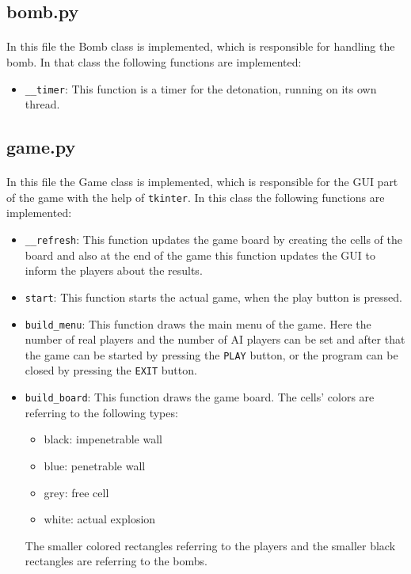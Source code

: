 \documentclass{article}
\begin{document}
    \subsection{bomb.py}
        \paragraph{}
        In this file the Bomb class is implemented, which is responsible for handling the bomb. In that class the following functions are implemented:
        \begin{itemize}
            \item \verb|__timer|: This function is a timer for the detonation, running on its own thread.
        \end{itemize}

    \subsection{game.py}
        \paragraph{}
        In this file the Game class is implemented, which is responsible for the GUI part of the game with the help of \verb|tkinter|. In this class the following functions are implemented:
        \begin{itemize}
            \item \verb|__refresh|: This function updates the game board by creating the cells of the board and also at the end of the game this function updates the GUI to inform the players about the results.
            \item \verb|start|: This function starts the actual game, when the play button is pressed.
            \item \verb|build_menu|: This function draws the main menu of the game. Here the number of real players and the number of AI players can be set and after that the game can be started by pressing the \verb|PLAY| button, or the program can be closed by pressing the \verb|EXIT| button.
            \item \verb|build_board|: This function draws the game board. The cells' colors are referring to the following types:
                \begin{itemize}
                    \item black: impenetrable wall
                    \item blue: penetrable wall
                    \item grey: free cell
                    \item white: actual explosion
                \end{itemize}
            The smaller colored rectangles referring to the players and the smaller black rectangles are referring to the bombs.
        \end{itemize}
\end{document}
